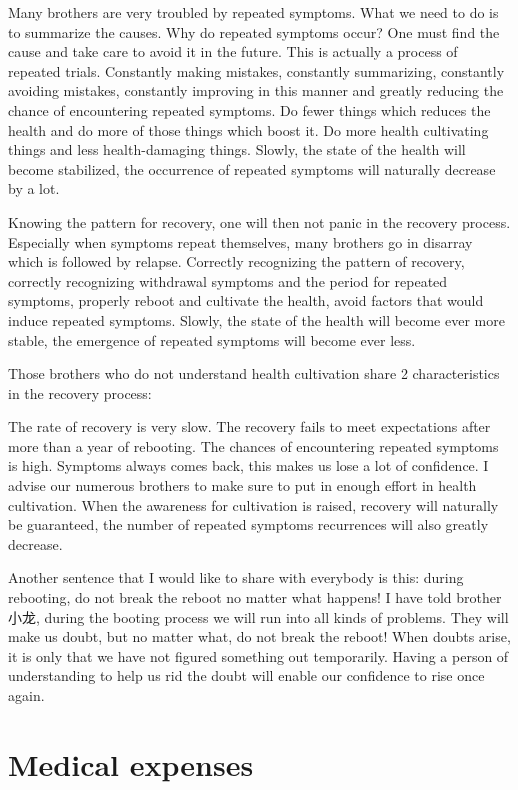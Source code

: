 \documentclass[
]{book}
\begin{document}
Many brothers are very troubled by repeated symptoms. What we need to do is to summarize the causes. Why do repeated symptoms occur? One must find the cause and take care to avoid it in the future. This is actually a process of repeated trials. Constantly making mistakes, constantly summarizing, constantly avoiding mistakes, constantly improving in this manner and greatly reducing the chance of encountering repeated symptoms. Do fewer things which reduces the health and do more of those things which boost it. Do more health cultivating things and less health-damaging things. Slowly, the state of the health will become stabilized, the occurrence of repeated symptoms will naturally decrease by a lot.

Knowing the pattern for recovery, one will then not panic in the recovery process. Especially when symptoms repeat themselves, many brothers go in disarray which is followed by relapse. Correctly recognizing the pattern of recovery, correctly recognizing withdrawal symptoms and the period for repeated symptoms, properly reboot and cultivate the health, avoid factors that would induce repeated symptoms. Slowly, the state of the health will become ever more stable, the emergence of repeated symptoms will become ever less.

Those brothers who do not understand health cultivation share 2 characteristics in the recovery process:

The rate of recovery is very slow. The recovery fails to meet expectations after more than a year of rebooting.
The chances of encountering repeated symptoms is high. Symptoms always comes back, this makes us lose a lot of confidence.
I advise our numerous brothers to make sure to put in enough effort in health cultivation. When the awareness for cultivation is raised, recovery will naturally be guaranteed, the number of repeated symptoms recurrences will also greatly decrease.

Another sentence that I would like to share with everybody is this: during rebooting, do not break the reboot no matter what happens! I have told brother 小龙, during the booting process we will run into all kinds of problems. They will make us doubt, but no matter what, do not break the reboot! When doubts arise, it is only that we have not figured something out temporarily. Having a person of understanding to help us rid the doubt will enable our confidence to rise once again.

\hypertarget{medical-expenses}{%
\section{Medical expenses}\label{medical-expenses}}
\end{document}
